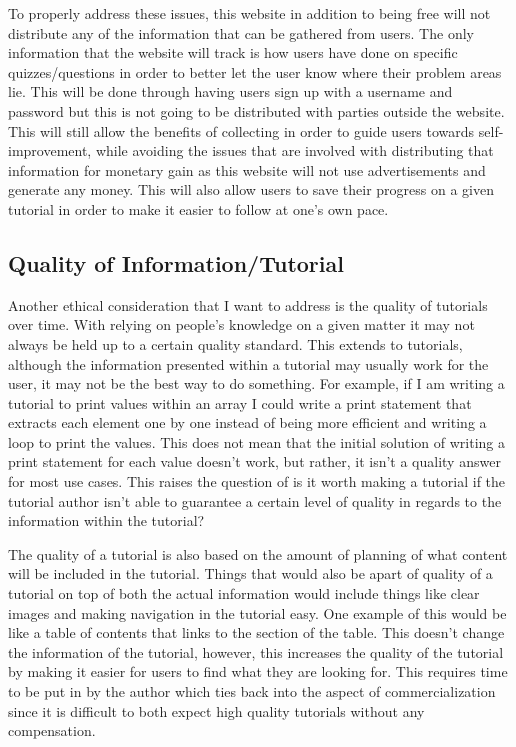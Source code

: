 \documentclass[10pt,twocolumn]{article}
\begin{document}
To properly address these issues, this website in addition to being free will not distribute any of the information that can be gathered from users. The only information that the website will track is how users have done on specific quizzes/questions in order to better let the user know where their problem areas lie. This will be done through having users sign up with a username and password but this is not going to be distributed with parties outside the website. This will still allow the benefits of collecting in order to guide users towards self-improvement, while avoiding the issues that are involved with distributing that information for monetary gain as this website will not use advertisements and generate any money. This will also allow users to save their progress on a given tutorial in order to make it easier to follow at one's own pace.

\subsection{Quality of Information/Tutorial}
Another ethical consideration that I want to address is the quality of tutorials over time. With relying on people's knowledge on a given matter it may not always be held up to a certain quality standard. This extends to tutorials, although the information presented within a tutorial may usually work for the user, it may not be the best way to do something. For example, if I am writing a tutorial to print values within an array I could write a print statement that extracts each element one by one instead of being more efficient and writing a loop to print the values. This does not mean that the initial solution of writing a print statement for each value doesn't work, but rather, it isn't a quality answer for most use cases. This raises the question of is it worth making a tutorial if the tutorial author isn't able to guarantee a certain level of quality in regards to the information within the tutorial?

The quality of a tutorial is also based on the amount of planning of what content will be included in the tutorial\cite{mclean_recommendations_2022}. Things that would also be apart of quality of a tutorial on top of both the actual information would include things like clear images and making navigation in the tutorial easy. One example of this would be like a table of contents that links to the section of the table. This doesn't change the information of the tutorial, however, this increases the quality of the tutorial by making it easier for users to find what they are looking for. This requires time to be put in by the author which ties back into the aspect of commercialization since it is difficult to both expect high quality tutorials without any compensation. 
\end{document}
